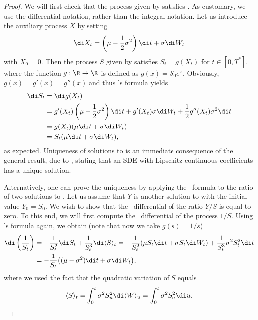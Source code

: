 \begin{proof}
	We will first check that the process given by  satisfies . As customary, we use the differential notation, rather than the integral notation. Let us introduce the auxiliary process $X$ by setting
	\begin{equation*}
		\di X_t = \left(\mu - \frac{1}{2}\sigma^2\right) \di t + \sigma \di W_t
	\end{equation*}
	with $X_0 = 0$. Then the process $S$ given by  satisfies $S_t = g(X_t)$ for $t \in [0, T^*]$, where the function $g : \R \to \R$ is defined as $g(x) = S_0 e^x$. Obviously, $g(x) = g'(x) = g''(x)$ and thus \Ito's formula yields
	\begin{align*}
		\di S_t & = \di g(X_t)                                                                                                      \\
		        & = g'(X_t)\left(\mu - \frac{1}{2}\sigma^2\right) \di t + g'(X_t)\sigma \di W_t + \frac{1}{2}g''(X_t)\sigma^2 \di t \\
		        & = g(X_t)(\mu \di t + \sigma \di W_t)                                                                              \\
		        & = S_t(\mu \di t + \sigma \di W_t),
	\end{align*}
	as expected. Uniqueness of solutions to  is an immediate consequence of the general result, due to \Ito, stating that an SDE with Lipschitz continuous coefficients has a unique solution.

	Alternatively, one can prove the uniqueness by applying the \Ito\ formula to the ratio of two solutions to . Let us assume that $Y$ is another solution to  with the initial value $Y_0 = S_0$. We wish to show that the \Ito\ differential of the ratio $Y/S$ is equal to zero. To this end, we will first compute the \Ito\ differential of the process $1/S$. Using \Ito's formula again, we obtain (note that now we take $g(s) = 1/s$)
	\begin{align*}
		\di \left(\frac{1}{S_t}\right) & = -\frac{1}{S_t^2} \di S_t + \frac{1}{S_t^3} \di \langle S \rangle_t = -\frac{1}{S_t^2} (\mu S_t \di t + \sigma S_t \di W_t) + \frac{1}{S_t^3} \sigma^2 S_t^2 \di t \\
		                               & = -\frac{1}{S_t} \bigl((\mu - \sigma^2) \di t + \sigma \di W_t \bigr),
	\end{align*}
	where we used the fact that the quadratic variation of $S$ equals
	\begin{equation} \label{eq:QuadraticVariationS}
		\langle S \rangle_t = \int_0^t \sigma^2 S_u^2 \di \langle W \rangle_u = \int_0^t \sigma^2 S_u^2 \di u.
	\end{equation}


\end{proof}
